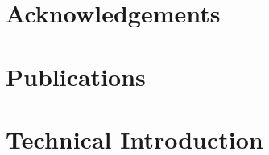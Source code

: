 \documentclass[a4paper]{report}
\begin{document}

\chapter*{Acknowledgements}

\chapter*{Publications}

\begin{abstract}
\end{abstract}

\tableofcontents

\listoffigures

\listoftables
{}







\chapter{Technical Introduction}
\label{ch:techintro}

\end{document}
